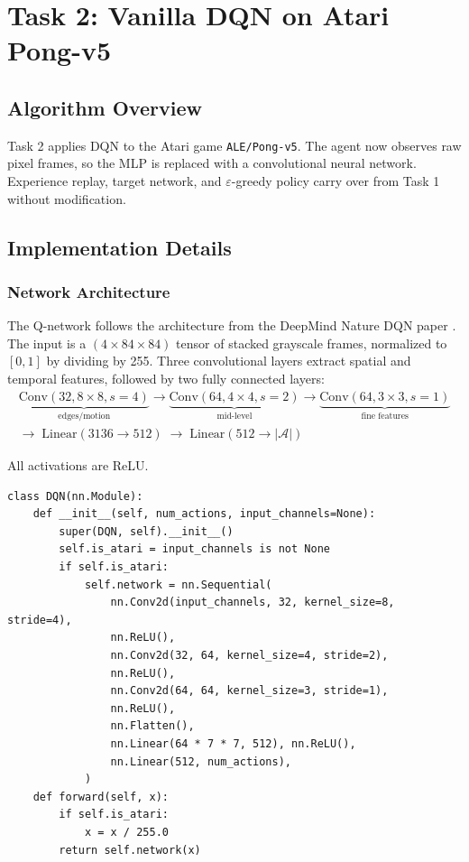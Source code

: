 \documentclass[12pt, a4paper]{report}
\begin{document}
\section{Task 2: Vanilla DQN on Atari Pong-v5}

\subsection{Algorithm Overview}

Task 2 applies DQN to the Atari game \texttt{ALE/Pong-v5}. The agent now observes raw pixel frames,
so the MLP is replaced with a convolutional neural network. Experience replay, target network, and
$\varepsilon$-greedy policy carry over from Task 1 without modification.

\subsection{Implementation Details}

\subsubsection*{Network Architecture}

The Q-network follows the architecture from the DeepMind Nature DQN paper \cite{mnih2015}. The input
is a $(4 \times 84 \times 84)$ tensor of stacked grayscale frames, normalized to $[0,1]$ by dividing
by 255. Three convolutional layers extract spatial and temporal features, followed by two fully
connected layers:
\begin{multline*}
\underbrace{\text{Conv}(32,8\times8,s\!=\!4)}_{\text{edges/motion}}
\!\to\!
\underbrace{\text{Conv}(64,4\times4,s\!=\!2)}_{\text{mid-level}}
\!\to\!
\underbrace{\text{Conv}(64,3\times3,s\!=\!1)}_{\text{fine features}}\\
\to\;
\text{Linear}(3136\to512)
\;\to\;
\text{Linear}(512\to|\mathcal{A}|)
\end{multline*}

All activations are ReLU.

\begin{lstlisting}[caption={DQN CNN for Atari (Task 2).}]
class DQN(nn.Module):
    def __init__(self, num_actions, input_channels=None):
        super(DQN, self).__init__()
        self.is_atari = input_channels is not None
        if self.is_atari:
            self.network = nn.Sequential(
                nn.Conv2d(input_channels, 32, kernel_size=8, stride=4),
                nn.ReLU(),
                nn.Conv2d(32, 64, kernel_size=4, stride=2),
                nn.ReLU(),
                nn.Conv2d(64, 64, kernel_size=3, stride=1),
                nn.ReLU(),
                nn.Flatten(),
                nn.Linear(64 * 7 * 7, 512), nn.ReLU(),
                nn.Linear(512, num_actions),
            )
    def forward(self, x):
        if self.is_atari:
            x = x / 255.0
        return self.network(x)
\end{lstlisting}
\end{document}
